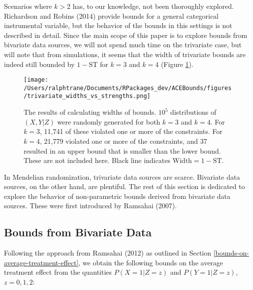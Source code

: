 \documentclass[
]{article}
\theoremstyle{plain}
\begin{document}
Scenarios where \(k > 2\) has, to our knowledge, not been thoroughly explored. Richardson and Robins (2014) provide bounds for a general categorical instrumental variable, but the behavior of the bounds in this settings is not described in detail. Since the main scope of this paper is to explore bounds from bivariate data sources, we will not spend much time on the trivariate case, but will note that from simulations, it seems that the width of trivariate bounds are indeed still bounded by \(1 - \text{ST}\) for \(k=3\) and \(k=4\) (Figure \ref{fig:trivariate-bound-on-width}).

\begin{figure}
\center
\texttt{[image: /Users/ralphtrane/Documents/RPackages\_dev/ACEBounds/figures/trivariate\_widths\_vs\_strengths.png]}
\caption{The results of calculating widths of bounds. \ensuremath{10^{5}} distributions of $(X,Y|Z)$ were randomly generated for both $k = 3$ and $k = 4$. For $k = 3$, 11,741 of these violated one or more of the constraints. For $k = 4$, 21,779 violated one or more of the constraints, and 37 resulted in an upper bound that is smaller than the lower bound. These are not included here. Black line indicates $\text{Width} = 1-\text{ST}$.}
\label{fig:trivariate-bound-on-width}
\end{figure}

In Mendelian randomization, trivariate data sources are scarce. Bivariate data sources, on the other hand, are plentiful. The rest of this section is dedicated to explore the behavior of non-parametric bounds derived from bivariate data sources. These were first introduced by Ramsahai (2007).

\hypertarget{bounds-from-bivariate-data}{%
\subsection{Bounds from Bivariate Data}\label{bounds-from-bivariate-data}}

Following the approach from Ramsahai (2012) as outlined in Section \ref{bounds-on-average-treatment-effect}, we obtain the following bounds on the average treatment effect from the quantities \(P(X = 1 | Z = z)\) and \(P(Y = 1 | Z = z)\), \(z = 0,1,2\):

\iffalse
\end{document}
